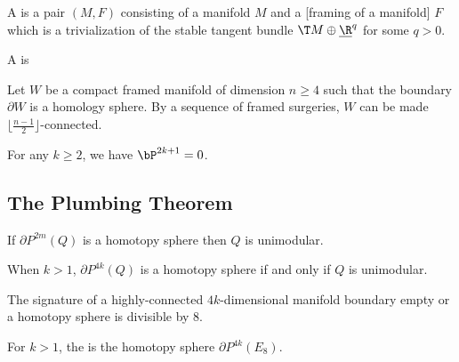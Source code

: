 \begin{definition}
	A  is a pair $(M, F)$ consisting of a manifold $M$ and a [framing of a manifold] $F$ which is a trivialization of the stable tangent bundle $\T M \oplus\underline{\R}^q$ for some $q>0$.
\end{definition}

\begin{definition}
	A  is
\end{definition}

\begin{theorem}
	Let $W$ be a compact framed manifold of dimension $n\geq 4$ such that the boundary $\partial W$ is a homology sphere. By a sequence of framed surgeries, $W$ can be made $\lfloor\frac{n-1}{2}\rfloor$-connected.
\end{theorem}

\begin{corollary}
	For any $k\geq 2$, we have $\bP^{2k+1}=0$.
\end{corollary}



\subsection{The Plumbing Theorem}\label{sec:plumbing-theorem}

\begin{proposition}
	If $\partial P^{2m}(Q)$ is a homotopy sphere then $Q$ is unimodular.
\end{proposition}

\begin{theorem}
	When $k>1$, $\partial P^{4k}(Q)$ is a homotopy sphere if and only if $Q$ is unimodular.
\end{theorem}


\begin{proposition}
	The signature of a highly-connected $4k$-dimensional manifold boundary empty or a homotopy sphere is divisible by $8$.
\end{proposition}

\begin{definition}
	For $k>1$, the  is the homotopy sphere $\partial P^{4k}(E_8)$.
\end{definition}

\begin{definition}
\end{definition}


